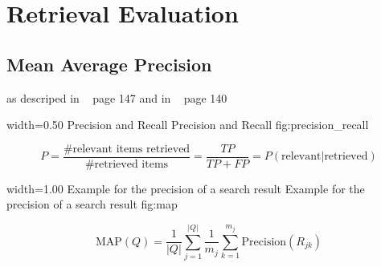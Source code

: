\section{Retrieval Evaluation}
\label{sec:retrieval_evaluation}

\subsection{Mean Average Precision}
\label{sec:mean_average_precision}

as descriped in ~\cite{manning2008} page 147 and in ~\cite{ModernInvormationRetrieval1999} page 140

      {width=0.50\textwidth}
      {Precision and Recall}
      {Precision and Recall}
      {fig:precision_recall}

\begin{equation}
  P = \frac{\text{\# relevant items retrieved}}{\text{\# retrieved items}} = \frac{TP}{TP + FP} = P(\text{relevant} | \text{retrieved})
\end{equation}

      {width=1.00\textwidth}
      {Example for the precision of a search result}
      {Example for the precision of a search result}
      {fig:map}

\begin{equation}
  \text{MAP}(Q) = \frac{1}{|Q|}\sum_{j = 1}^{|Q|} \frac{1}{m_j}\sum_{k = 1}^{m_j}\text{Precision}(R_{jk})
\end{equation}
